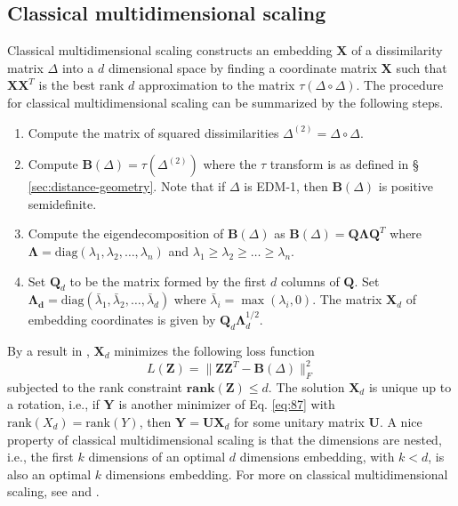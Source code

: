 \subsection{Classical multidimensional scaling}
\label{sec:classical-mds}
Classical multidimensional scaling \citep{torgesen52:_multid}
constructs an embedding $\mathbf{X}$ of a dissimilarity matrix
$\Delta$ into a $d$ dimensional space by finding a coordinate matrix
$\mathbf{X}$ such that $\mathbf{X}\mathbf{X}^{T}$ is the best rank $d$
approximation to the matrix $\tau(\Delta \circ \Delta)$. The procedure
for classical multidimensional scaling can be summarized by the
following steps.
\begin{enumerate}
\item Compute the matrix of squared dissimilarities $\Delta^{(2)} =
  \Delta \circ \Delta$.
\item Compute $\mathbf{B}(\Delta) = \tau(\Delta^{(2)})$ where the
  $\tau$ transform is as defined in \S
  \ref{sec:distance-geometry}. Note that if $\Delta$ is EDM-1, then
  $\mathbf{B}(\Delta)$ is positive semidefinite. 
\item Compute the eigendecomposition of $\mathbf{B}(\Delta)$ as
  $\mathbf{B}(\Delta) = \mathbf{Q} \bm{\Lambda} \mathbf{Q}^{T}$ where
  $\bm{\Lambda} = \mathrm{diag}(\lambda_1, \lambda_2, \dots,
  \lambda_n)$ and $\lambda_1 \geq \lambda_2 \geq \dots \geq
  \lambda_n$.  
\item Set $\mathbf{Q}_d$ to be the matrix formed by the first $d$
  columns of $\mathbf{Q}$. Set $\bm{\Lambda_{d}} =
  \mathrm{diag}(\bar{\lambda}_1,\bar{\lambda}_2, \dots,
  \bar{\lambda}_d)$ where $\bar{\lambda}_i = \max(\lambda_i, 0)$. The
  matrix $\mathbf{X}_d$ of embedding coordinates is given by
  $\mathbf{Q}_d \mathbf{\Lambda}_{d}^{1/2}$.
\end{enumerate}
By a result in \citet{eckart36:_approx}, $\mathbf{X}_d$ minimizes the
following loss function
\begin{equation}
  \label{eq:87}
 L(\mathbf{Z}) = \| \mathbf{Z} \mathbf{Z}^{T} - \mathbf{B}(\Delta)
 \|_F^{2} 
\end{equation}
subjected to the rank constraint $\mathbf{rank}(\mathbf{Z}) \leq
d$. The solution $\mathbf{X}_d$ is unique up to a rotation, i.e., if
$\mathbf{Y}$ is another minimizer of Eq. \eqref{eq:87} with
$\mathrm{rank}(X_d) = \mathrm{rank}(Y)$, then $\mathbf{Y} =
\mathbf{U}\mathbf{X}_d$ for some unitary matrix $\mathbf{U}$. A nice
property of classical multidimensional scaling is that the dimensions
are nested, i.e., the first $k$ dimensions of an optimal $d$
dimensions embedding, with $k < d$, is also an optimal $k$ dimensions
embedding. For more on classical multidimensional scaling, see
\citet{borg05:_moder} and \citet{gower66:_some}.
%
%
